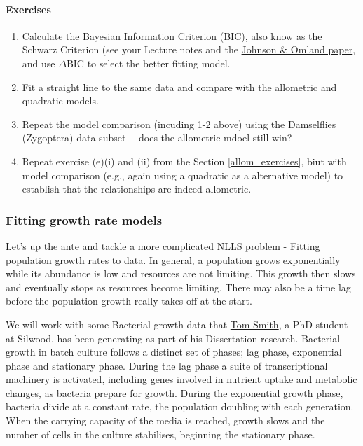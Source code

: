 \documentclass[11pt]{article}
\begin{document}
    \paragraph{Exercises}\label{exercises}

\begin{enumerate}
\def\labelenumi{(\alph{enumi})}
\item
  Calculate the Bayesian Information Criterion (BIC), also know as the
  Schwarz Criterion (see your Lecture notes and the
  \href{https://github.com/mhasoba/TheMulQuaBio/blob/master/Readings/Modelling/JohnsonOmland2004.pdf}{Johnson
  \& Omland paper}, and use \(\Delta\)BIC to select the better fitting
  model.
\item
  Fit a straight line to the same data and compare with the allometric
  and quadratic models.
\item
  Repeat the model comparison (incuding 1-2 above) using the Damselflies
  (Zygoptera) data subset -\/- does the allometric mdoel still win?
\item
  Repeat exercise (e)(i) and (ii) from the
  Section \ref{allom_exercises}, biut with model comparison (e.g., again
  using a quadratic as a alternative model) to establish that the
  relationships are indeed allometric.
\end{enumerate}

    \subsubsection{Fitting growth rate
models}\label{fitting-growth-rate-models}

Let's up the ante and tackle a more complicated NLLS problem - Fitting
population growth rates to data. In general, a population grows
exponentially while its abundance is low and resources are not limiting.
This growth then slows and eventually stops as resources become
limiting. There may also be a time lag before the population growth
really takes off at the start.

We will work with some Bacterial growth data that
\href{https://mhasoba.pythonanywhere.com/pawarlab/default/people}{Tom
Smith}, a PhD student at Silwood, has been generating as part of his
Dissertation research. Bacterial growth in batch culture follows a
distinct set of phases; lag phase, exponential phase and stationary
phase. During the lag phase a suite of transcriptional machinery is
activated, including genes involved in nutrient uptake and metabolic
changes, as bacteria prepare for growth. During the exponential growth
phase, bacteria divide at a constant rate, the population doubling with
each generation. When the carrying capacity of the media is reached,
growth slows and the number of cells in the culture stabilises,
beginning the stationary phase.
\end{document}
